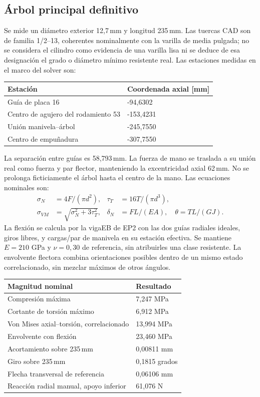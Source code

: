 \subsection{Árbol principal definitivo}
\label{app:prototipo_A7}
Se mide un diámetro exterior 12,7\,mm y longitud 235\,mm. Las tuercas CAD son
de familia 1/2--13, coherentes nominalmente con la varilla de media pulgada;
no se considera el cilindro como evidencia de una varilla lisa ni se
deduce de esa designación el grado o diámetro mínimo resistente real.
Las estaciones medidas en el marco del solver son:
\begin{center}\begin{tabular}{ll}\toprule
Estación & Coordenada axial [mm]\\\midrule
Guía de placa 16 & -94,6302\\
Centro de agujero del rodamiento 53 & -153,4231\\
Unión manivela--árbol & -245,7550\\
Centro de empuñadura & -307,7550\\
\bottomrule\end{tabular}\end{center}

La separación entre guías es 58,793\,mm.
La fuerza de mano se traslada a su unión real como fuerza y par flector,
manteniendo la excentricidad axial 62\,mm. No se prolonga ficticiamente el
árbol hasta el centro de la mano. Las ecuaciones nominales son:
\begin{align}
 \sigma_N&=4F/(\pi d^2),&\tau_T&=16T/(\pi d^3),\\
 \sigma_{VM}&=\sqrt{\sigma_N^2+3\tau_T^2},&
 \delta_N&=FL/(EA),\quad\theta=TL/(GJ).
\end{align}
La flexión se calcula por la vigaEB de EP2 con las dos guías radiales
ideales, giros libres, y cargas/par de manivela en su estación efectiva.
Se mantiene $E=210$ GPa y $\nu=0,30$ de referencia, sin atribuirles una clase
resistente. La envolvente flectora combina orientaciones posibles dentro
de un mismo estado correlacionado, sin mezclar máximos de otros ángulos.
\begin{center}\begin{tabular}{ll}\toprule
Magnitud nominal & Resultado\\\midrule
Compresión máxima & 7,247 MPa\\
Cortante de torsión máximo & 6,912 MPa\\
Von Mises axial--torsión, correlacionado & 13,994 MPa\\
Envolvente con flexión & 23,460 MPa\\
Acortamiento sobre 235\,mm & 0,00811 mm\\
Giro sobre 235\,mm & 0,1815 grados\\
Flecha transversal de referencia & 0,06106 mm\\
Reacción radial manual, apoyo inferior & 61,076 N\\
\bottomrule\end{tabular}\end{center}

